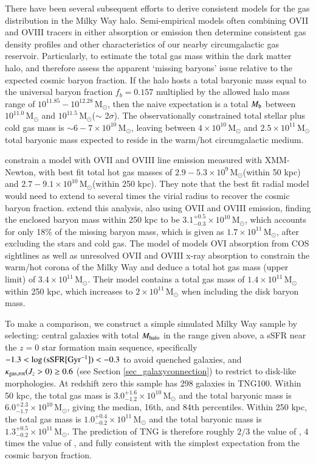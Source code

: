 \documentclass[useAMS,usenatbib]{mnras}
\newcommand{\msun}{\,M$_{\odot}$\xspace}
\newcommand{\ovi}{OVI\xspace}
\newcommand{\ovii}{OVII\xspace}
\newcommand{\oviii}{OVIII\xspace}
\begin{document}
There have been several subsequent efforts to derive consistent models for the gas distribution in the Milky Way halo. Semi-empirical models often combining \ovii and \oviii tracers in either absorption or emission then determine consistent gas density profiles and other characteristics of our nearby circumgalactic gas reservoir. Particularly, to estimate the total gas mass within the dark matter halo, and therefore assess the apparent `missing baryons' issue relative to the expected cosmic baryon fraction. If the halo hosts a total baryonic mass equal to the universal baryon fraction $f_b = 0.157$ \citep{planck2015_xiii} multiplied by the allowed halo mass range of $10^{11.85} - 10^{12.28}$\msun \citep[$2\sigma$ bounds of][]{mcmillan17}, then the naive expectation is a total $M_{\rm b}$ between $10^{11.0}$\msun and $10^{11.5}$\msun ($\sim$ 2$\sigma$). The observationally constrained total stellar plus cold gas mass is $\sim 6-7 \times 10^{10}$\msun \citep{mcmillan17}, leaving between $4 \times 10^{10}$\msun and $2.5 \times 10^{11}$\msun total baryonic mass expected to reside in the warm/hot circumgalactic medium. 

\cite{miller15} constrain a model with \ovii and \oviii line emission measured with XMM-Newton, with best fit total hot gas masses of $2.9 - 5.3 \times 10^{9}$\msun (within 50 kpc) and $2.7 - 9.1 \times 10^{10}$\msun (within 250 kpc). They note that the best fit radial model would need to extend to several times the virial radius to recover the cosmic baryon fraction. \cite{li17} extend this analysis, also using \ovii and \oviii emission, finding the enclosed baryon mass within 250 kpc to be $3.1^{+0.5}_{-0.3} \times 10^{10}$\msun, which accounts for only 18\% of the missing baryon mass, which is given as $1.7 \times 10^{11}$\msun, after excluding the stars and cold gas. The model of \cite{faerman17} models \ovi absorption from COS sightlines as well as unresolved \ovii and \oviii x-ray absorption to constrain the warm/hot corona of the Milky Way and deduce a total hot gas mass (upper limit) of $3.4 \times 10^{11}$\msun. Their model contains a total gas mass of $1.4 \times 10^{11}$\msun within 250 kpc, which increases to $2 \times 10^{11}$\msun when including the disk baryon mass.

To make a comparison, we construct a simple simulated Milky Way sample by selecting: central galaxies with total $M_{\rm halo}$ in the range given above, a sSFR near the $z=0$ star formation main sequence, specifically $-1.3 < \log{(\rm{sSFR [Gyr^{-1}]})} < -0.3$ to avoid quenched galaxies, and $\kappa_{\rm gas,rot}(J_z > 0) \ge 0.6$ (see Section \ref{sec_galaxyconnection}) to restrict to disk-like morphologies. At redshift zero this sample has 298 galaxies in TNG100. Within 50 kpc, the total gas mass is $3.0^{+1.6}_{-1.2} \times 10^{10}$\msun and the total baryonic mass is $6.0^{+2.3}_{-1.7} \times 10^{10}$\msun, giving the median, 16th, and 84th percentiles. Within 250 kpc, the total gas mass is $1.0^{+0.4}_{-0.2} \times 10^{11}$\msun and the total baryonic mass is $1.3^{+0.5}_{-0.2} \times 10^{11}$\msun. The prediction of TNG is therefore roughly $2/3$ the value of \cite{faerman17}, 4 times the value of \cite{li17}, and fully consistent with the simplest expectation from the cosmic baryon fraction.
\end{document}
